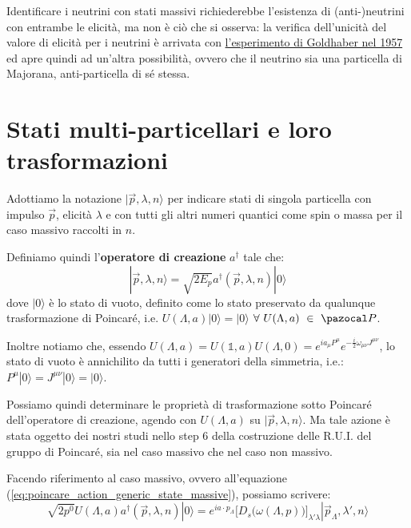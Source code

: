 \documentclass[../main.tex]{subfiles}
\begin{document}
Identificare i neutrini con stati massivi richiederebbe l'esistenza di (anti-)neutrini con entrambe le elicità, ma non è ciò che si osserva: la verifica dell'unicità del valore di elicità per i neutrini è arrivata con \href{https://journals.aps.org/pr/pdf/10.1103/PhysRev.109.1015}{l'esperimento di Goldhaber nel 1957} ed apre quindi ad un'altra possibilità, ovvero che il neutrino sia una particella di Majorana, anti-particella di sé stessa.


\section{Stati multi-particellari e loro trasformazioni}

Adottiamo la notazione \(\boxed{|\Vec{p},\lambda,n\rangle}\) per indicare stati di singola particella con impulso \(\Vec{p}\), elicità $\lambda$ e con tutti gli altri numeri quantici come spin o massa per il caso massivo raccolti in $n$.

Definiamo quindi l'\textbf{operatore di creazione} $a^\dagger$ tale che:
\begin{equation}
    |\Vec{p},\lambda,n\rangle  = \sqrt{2E_p} a^\dagger(\Vec{p},\lambda,n)|0\rangle
    \label{eq:creation_operator}
\end{equation}
dove $|0\rangle$ è lo stato di vuoto, definito come lo stato preservato da qualunque trasformazione di Poincaré, i.e. $U(\Lambda, a)|0\rangle = |0\rangle$ $\forall ~U(\Lambda,a) ~\in~\pazocal P$.

Inoltre notiamo che, essendo \(U(\Lambda, a) = U(\mathbb 1, a)U(\Lambda, 0) = e^{ia_\mu P^\mu}e^{-\frac{i}{2}\omega_{\mu\nu} J^{\mu\nu}}\), lo stato di vuoto è annichilito da tutti i generatori della simmetria, i.e.: \(P^\mu|0\rangle = J^{\mu\nu}|0\rangle = |0\rangle\).

Possiamo quindi determinare le proprietà di trasformazione sotto Poincaré dell'operatore di creazione, agendo con $U(\Lambda, a)$ su $|\Vec{p},\lambda,n\rangle$. Ma tale azione è stata oggetto dei nostri studi nello step 6 della costruzione delle R.U.I. del gruppo di Poincaré, sia nel caso massivo che nel caso non massivo. 

Facendo riferimento al caso massivo, ovvero all'equazione (\ref{eq:poincare_action_generic_state_massive}), possiamo scrivere:
\[
\sqrt{2p^0} U(\Lambda, a) a^\dagger(\Vec{p},\lambda,n)|0\rangle = e^{ia\cdot p_\Lambda}\Big[D_s\big(\omega(\Lambda, p)\big)\Big]_{\lambda'\lambda}|\Vec{p}_\Lambda,\lambda',n\rangle
\]
\end{document}
